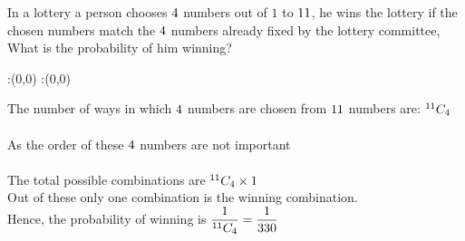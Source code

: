 



\question[4] In a lottery a person chooses $4$ numbers out of $1$ to $11$, he wins the lottery if the chosen numbers match the $4$
numbers already fixed by the lottery committee, What is the probability of him winning?   


\watchout

\ifprintanswers
  \begin{marginfigure}
      :(0,0)
      :(0,0)
    \figdrawbegin{}
      \figdrawline [100,101]
    \figdrawend
    \figvisu{\figBoxA}{}{%
    }
    \centerline{\box\figBoxA}
  \end{marginfigure}
\fi 

\begin{solution}[\halfpage]
The number of ways in which $4$ numbers are chosen from $11$ numbers are:
 $^{11}{C}_{4}$ \\   \\
\quad  As the order of these $4$ numbers are not important \\  \\
The total possible combinations are $^{11}{C}_{4} \times 1 $\\
Out of these only one combination is the winning combination.\\
Hence, the probability of winning is $\dfrac{1}{^{11}{C}_{4}} = \dfrac{1}{330}$
\end{solution}

